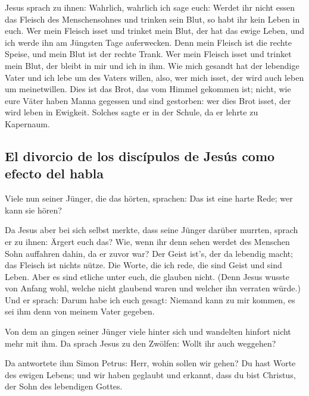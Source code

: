  Jesus sprach zu ihnen: Wahrlich, wahrlich ich sage euch:
Werdet ihr nicht essen das Fleisch des Menschensohnes und trinken sein
Blut, so habt ihr kein Leben in euch.  Wer mein Fleisch
isset und trinket mein Blut, der hat das ewige Leben, und ich werde ihn
am Jüngsten Tage auferwecken.  Denn mein Fleisch ist die
rechte Speise, und mein Blut ist der rechte Trank.  Wer
mein Fleisch isset und trinket mein Blut, der bleibt in mir und ich in
ihm.  Wie mich gesandt hat der lebendige Vater und ich
lebe um des Vaters willen, also, wer mich isset, der wird auch leben um
meinetwillen.  Dies ist das Brot, das vom Himmel gekommen
ist; nicht, wie eure Väter haben Manna gegessen und sind gestorben: wer
dies Brot isset, der wird leben in Ewigkeit.  Solches
sagte er in der Schule, da er lehrte zu Kapernaum.

\hypertarget{el-divorcio-de-los-discuxedpulos-de-jesuxfas-como-efecto-del-habla}{%
\subsection{El divorcio de los discípulos de Jesús como efecto del
habla}\label{el-divorcio-de-los-discuxedpulos-de-jesuxfas-como-efecto-del-habla}}

 Viele nun seiner Jünger, die das hörten, sprachen: Das
ist eine harte Rede; wer kann sie hören?

 Da Jesus aber bei sich selbst merkte, dass seine Jünger
darüber murrten, sprach er zu ihnen: Ärgert euch das? 
Wie, wenn ihr denn sehen werdet des Menschen Sohn auffahren dahin, da er
zuvor war?  Der Geist ist's, der da lebendig macht; das
Fleisch ist nichts nütze. Die Worte, die ich rede, die sind Geist und
sind Leben.  Aber es sind etliche unter euch, die glauben
nicht. (Denn Jesus wusste von Anfang wohl, welche nicht glaubend waren
und welcher ihn verraten würde.)  Und er sprach: Darum
habe ich euch gesagt: Niemand kann zu mir kommen, es sei ihm denn von
meinem Vater gegeben.

 Von dem an gingen seiner Jünger viele hinter sich und
wandelten hinfort nicht mehr mit ihm.  Da sprach Jesus zu
den Zwölfen: Wollt ihr auch weggehen?

 Da antwortete ihm Simon Petrus: Herr, wohin sollen wir
gehen? Du hast Worte des ewigen Lebens;  und wir haben
geglaubt und erkannt, dass du bist Christus, der Sohn des lebendigen
Gottes.

